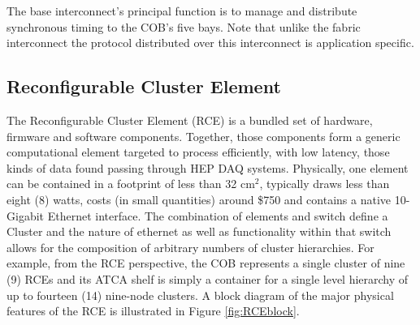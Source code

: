 The base interconnect's principal function is to manage 
and distribute synchronous timing to the COB's five bays.
Note that unlike the fabric interconnect the protocol 
distributed over this interconnect is application specific. 


\subsection{Reconfigurable Cluster Element}
\label{sec:RCE}
The Reconfigurable Cluster Element (RCE) is a bundled set of hardware, 
firmware and software components. 
Together, those components form a generic computational element 
targeted to process efficiently, with low latency, those
kinds of data found passing through HEP DAQ systems. 
Physically, one element can be contained in a footprint of less than 32 cm$^2$, 
typically draws less than eight (8) watts, costs (in small quantities) 
around \$750 and contains a native 10-Gigabit Ethernet interface. 
The combination of elements and switch define a Cluster and 
the nature of ethernet as well as functionality within that switch 
allows for the composition of arbitrary numbers of cluster hierarchies. 
For example, from the RCE perspective, the COB represents a single cluster 
of nine (9) RCEs and its ATCA shelf is simply a container for a 
single level hierarchy of up to fourteen (14) nine-node clusters. 
A block diagram of the major physical features of the RCE is illustrated in Figure 
\ref{fig:RCEblock}.

